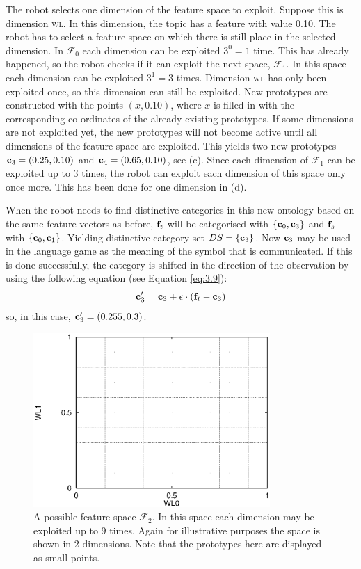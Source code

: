 The robot selects one dimension of the feature space to exploit. Suppose this is dimension {\scshape wl}. In this dimension, the topic has a feature with value 0.10. The robot has to select a feature space on which there is still place in the selected dimension. In ${\mathcal F}_0$ each dimension can be exploited $3^0=1$ time. This has already happened, so the robot checks if it can exploit the next space, ${\mathcal F}_1$. In this space each dimension can be exploited $3^1=3$ times. Dimension {\scshape wl} has only been exploited once, so this dimension can still be exploited. New prototypes are constructed with the points $(x,0.10)$, where $x$ is filled in with the corresponding co-ordinates of the already existing prototypes. If some dimensions are not exploited yet, the new prototypes will not become active until all dimensions of the feature space are exploited. This yields two new prototypes ${\bf c}_3=(0.25,0.10)$ and ${\bf c}_4=(0.65,0.10)$, see  (c). Since each dimension of ${\mathcal F}_1$ can be exploited up to 3 times, the robot can exploit each dimension of this space only once more. This has been done for one dimension in  (d).

When the robot needs to find distinctive categories in this new ontology based on the same feature vectors as before, ${\bf f}_t$ will be categorised with $\{{\bf c}_0,{\bf c}_3\}$ and ${\bf f}_s$ with $\{{\bf c}_0,{\bf c}_1\}$. Yielding distinctive category set $DS=\{{\bf c}_3\}$. Now ${\bf c}_3$ may be used in the language game as the meaning of the symbol that is communicated. If this is done successfully, the category is shifted in the direction of the observation by using the following equation (see Equation \ref{eq:3.9}):
\[
{\bf c}_3' = {\bf c}_3 + \epsilon \cdot ({\bf f}_t - {\bf c}_3)
\]
so, in this case, ${\bf c}_3'=(0.255,0.3)$.

\begin{figure}
\centerline{\includegraphics[width=9cm]{lang_games/proto3.eps}}
\caption{A possible feature space ${\mathcal F}_2$. In this space each dimension may be exploited up to 9 times. Again for illustrative purposes the space is shown in 2 dimensions. Note that the prototypes here are displayed as small points.}
\label{f:lg:proto2}
\end{figure}


